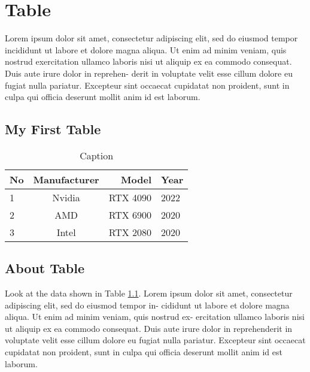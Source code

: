 

\chapter{Table}
Lorem ipsum dolor sit amet, consectetur adipiscing elit, sed do eiusmod tempor incididunt
ut labore et dolore magna aliqua. Ut enim ad minim veniam, quis nostrud exercitation
ullamco laboris nisi ut aliquip ex ea commodo consequat. Duis aute irure dolor in reprehen-
derit in voluptate velit esse cillum dolore eu fugiat nulla pariatur. Excepteur sint occaecat
cupidatat non proident, sunt in culpa qui officia deserunt mollit anim id est laborum.

\section{My First Table}

\begin{table}[h!]
  \begin{center}
    \label{Table 1.1}
    \begin{tabular}{|l|c|r|l|}
        \hline
      \textbf{No} & \textbf{Manufacturer} & \textbf{Model}& \textbf{Year}\\
      \hline
       1 & Nvidia & RTX 4090 & 2022\\
      \hline
       2 & AMD & RTX 6900 & 2020\\
      \hline
       3 & Intel & RTX 2080 & 2020\\
      \hline
    \end{tabular}
  \end{center}
  \caption{Caption}
\end{table}

\section{About Table}
Look at the data shown in Table \ref{Table 1.1}.
Lorem ipsum dolor sit amet, consectetur adipiscing elit, sed do eiusmod tempor in-
cididunt ut labore et dolore magna aliqua. Ut enim ad minim veniam, quis nostrud ex-
ercitation ullamco laboris nisi ut aliquip ex ea commodo consequat. Duis aute irure dolor in reprehenderit in voluptate velit esse cillum dolore eu fugiat nulla pariatur. Excepteur sint occaecat cupidatat non proident, sunt in culpa qui officia deserunt mollit anim id est laborum.
